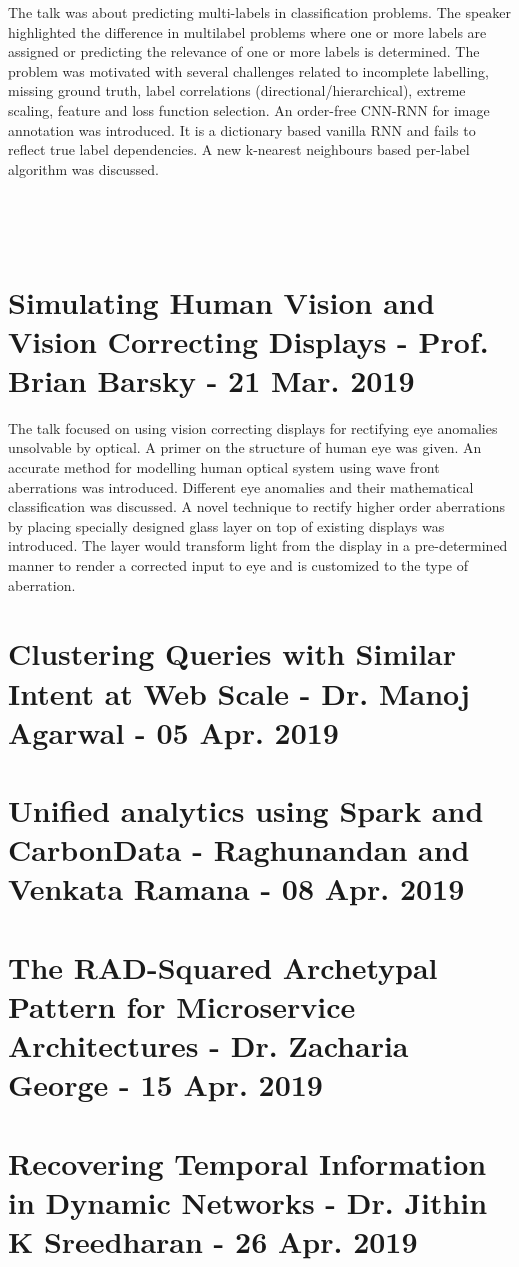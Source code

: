 \documentclass[11pt,a4paper,oneside]{article}
\begin{document}
	The talk was about predicting multi-labels in classification problems. The speaker highlighted the difference in multilabel problems where one or more labels are assigned or predicting the relevance of one or more labels is determined. The problem was motivated with several challenges related to incomplete labelling, missing ground truth, label correlations (directional/hierarchical), extreme scaling, feature and loss function selection. An order-free CNN-RNN for image annotation was introduced. It is a dictionary based vanilla RNN and fails to reflect true label dependencies. A new k-nearest neighbours based per-label algorithm was discussed.
	
	\pagebreak
	
	\begin{verbatim}
	
	
	
	\end{verbatim}
	
	\section{Simulating Human Vision and Vision Correcting Displays - Prof. Brian Barsky - 21 Mar. 2019}
	
	The talk focused on using vision correcting displays for rectifying eye anomalies unsolvable by optical. A primer on the structure of human eye was given. An accurate method for modelling human optical system using wave front aberrations was introduced. Different eye anomalies and their mathematical classification was discussed. A novel technique to rectify higher order aberrations by placing specially designed glass layer on top of existing displays was introduced. The layer would transform light from the display in a pre-determined manner to render a corrected input to eye and is customized to the type of aberration. 
	
	\section{Clustering Queries with Similar Intent at Web Scale - Dr. Manoj Agarwal - 05 Apr. 2019}
		
	\section{Unified analytics using Spark and CarbonData - Raghunandan and Venkata Ramana - 08 Apr. 2019}
	
	\section{The RAD-Squared Archetypal Pattern for Microservice Architectures - Dr. Zacharia George - 15 Apr. 2019}
	
	\section{Recovering Temporal Information in Dynamic Networks - Dr. Jithin K Sreedharan - 26 Apr. 2019}
	
    
\end{document}
